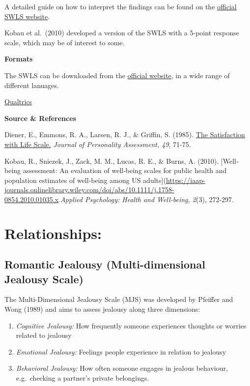 \documentclass[
]{book}
\providecommand{\tightlist}{%
  \setlength{\itemsep}{0pt}\setlength{\parskip}{0pt}}
\begin{document}
A detailed guide on how to interpret the findings can be found on the \href{http://labs.psychology.illinois.edu/~ediener/SWLS.html}{official SWLS website}.

Kobau et al.~(2010) developed a version of the SWLS with a 5-point response scale, which may be of interest to some.

\textbf{Formats}

The SWLS can be downloaded from the \href{http://labs.psychology.illinois.edu/~ediener/SWLS.html}{official website}, in a wide range of different lanuages.

\href{link\%20to\%20file}{Qualtrics}

\textbf{Source \& References}

Diener, E., Emmons, R. A., Larsen, R. J., \& Griffin, S. (1985). \href{https://emmons.faculty.ucdavis.edu/wp-content/uploads/sites/90/2015/08/1985_5-SWLS.pdf}{The Satisfaction with Life Scale.} \emph{Journal of Personality Assessment, 49}, 71-75.

Kobau, R., Sniezek, J., Zack, M. M., Lucas, R. E., \& Burns, A. (2010). {[}Well‐being assessment: An evaluation of well‐being scales for public health and population estimates of well‐being among US adults{]}(\url{https://iaap-journals.onlinelibrary.wiley.com/doi/abs/10.1111/j.1758-0854.2010.01035.x}.\emph{Applied Psychology: Health and Well-being, 2}(3), 272-297.

\hypertarget{relationships}{%
\section{Relationships:}\label{relationships}}

\hypertarget{romantic-jealousy-multi-dimensional-jealousy-scale}{%
\subsection{Romantic Jealousy (Multi-dimensional Jealousy Scale)}\label{romantic-jealousy-multi-dimensional-jealousy-scale}}

The Multi-Dimensional Jealousy Scale (MJS) was developed by Pfeiffer and Wong (1989) and aims to assess jealousy along three dimensions:

\begin{enumerate}
\def\labelenumi{\arabic{enumi}.}
\tightlist
\item
  \emph{Cognitive Jealousy:} How frequently someone experiences thoughts or worries related to jealousy
\item
  \emph{Emotional Jealousy:} Feelings people experience in relation to jealousy
\item
  \emph{Behavioral Jealousy:} How often someone engages in jealous behaviour, e.g.~checking a partner's private belongings.
\end{enumerate}
\end{document}
